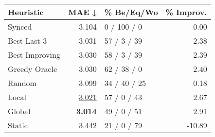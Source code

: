 \begin{tabular}{lrlr}
\toprule
\textbf{Heuristic} & \textbf{MAE ↓} & \textbf{\% Be/Eq/Wo} & \textbf{\% Improv.} \\
\midrule
            Synced &          3.104 &          0 / 100 / 0 &                0.00 \\
\midrule
       Best Last 3 &          3.031 &          57 / 3 / 39 &                2.38 \\
    Best Improving &          3.030 &          58 / 3 / 39 &                2.39 \\
\addlinespace
     Greedy Oracle &          3.030 &          62 / 38 / 0 &                2.40 \\
            Random &          3.099 &         34 / 40 / 25 &                0.18 \\
\midrule
             Local &          \underline{3.021} &          57 / 0 / 43 &                2.67 \\
            Global &          \textbf{3.014} &          49 / 0 / 51 &                2.91 \\
\midrule
            Static &          3.442 &          21 / 0 / 79 &              -10.89 \\
\bottomrule
\end{tabular}

\label{tab:ds_non_lr01_le1_bs2_Summary}
